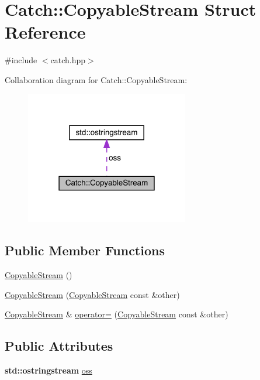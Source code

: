 \hypertarget{struct_catch_1_1_copyable_stream}{}\section{Catch\+:\+:Copyable\+Stream Struct Reference}
\label{struct_catch_1_1_copyable_stream}


{\ttfamily \#include $<$catch.\+hpp$>$}



Collaboration diagram for Catch\+:\+:Copyable\+Stream\+:
\nopagebreak
\begin{figure}[H]
\begin{center}
\leavevmode
\includegraphics[width=202pt]{struct_catch_1_1_copyable_stream__coll__graph}
\end{center}
\end{figure}
\subsection*{Public Member Functions}
\begin{DoxyCompactItemize}
\item 
\hyperlink{struct_catch_1_1_copyable_stream_a5a61d0da675ae00cd46efaef4c445cdd}{Copyable\+Stream} ()
\item 
\hyperlink{struct_catch_1_1_copyable_stream_a0e72dc16240653f52c17106f4bf34da8}{Copyable\+Stream} (\hyperlink{struct_catch_1_1_copyable_stream}{Copyable\+Stream} const \&other)
\item 
\hyperlink{struct_catch_1_1_copyable_stream}{Copyable\+Stream} \& \hyperlink{struct_catch_1_1_copyable_stream_a1760fa29b38011c5845171260bec0966}{operator=} (\hyperlink{struct_catch_1_1_copyable_stream}{Copyable\+Stream} const \&other)
\end{DoxyCompactItemize}
\subsection*{Public Attributes}
\begin{DoxyCompactItemize}
\item 
\textbf{ std\+::ostringstream} \hyperlink{struct_catch_1_1_copyable_stream_ae123fb4d673e7d7a13a3c5f6bc5d426c}{oss}
\end{DoxyCompactItemize}


